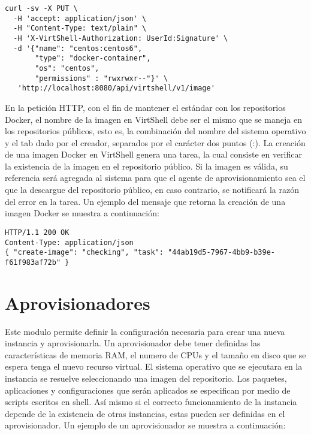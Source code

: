 \vspace{5mm}

\begin{lstlisting}[style=json, caption=Petición HTTP para crear una imagen para contenedores Docker]
curl -sv -X PUT \
  -H 'accept: application/json' \
  -H "Content-Type: text/plain" \
  -H 'X-VirtShell-Authorization: UserId:Signature' \
  -d '{"name": "centos:centos6",
       "type": "docker-container",
       "os": "centos",
       "permissions" : "rwxrwxr--"}' \
   'http://localhost:8080/api/virtshell/v1/image'
\end{lstlisting}

\vspace{5mm}

En la petición HTTP, con el fin de mantener el estándar con los repositorios Docker, el nombre de la imagen en VirtShell debe ser el mismo que se maneja en los repositorios públicos, esto es, la combinación del nombre del sistema operativo y el tab dado por el creador, separados por el carácter dos puntos (:). La creación de una imagen Docker en VirtShell genera una tarea, la cual consiste en verificar la existencia de la imagen en el repositorio público. Si la imagen es válida, su referencia será agregada al sistema para que el agente de aprovisionamiento sea el que la descargue del repositorio público, en caso contrario, se notificará la razón del error en la tarea. Un ejemplo del mensaje que retorna la creación de una imagen Docker se muestra a continuación:

\vspace{5mm}

\begin{lstlisting}[style=json, caption=Ejemplo de respuesta HTTP para la creación de una imagen]
HTTP/1.1 200 OK
Content-Type: application/json
{ "create-image": "checking", "task": "44ab19d5-7967-4bb9-b39e-f61f983af72b" }
\end{lstlisting}


\section{Aprovisionadores}
Este modulo permite definir la configuración necesaria para crear una nueva instancia y aprovisionarla. Un aprovisionador debe tener definidas las características de memoria RAM, el numero de CPUs y el tamaño en disco que se espera tenga el nuevo recurso virtual. El sistema operativo que se ejecutara en la instancia se resuelve seleccionando una imagen del repositorio. Los paquetes, aplicaciones y configuraciones que serán aplicados se especifican por medio de scripts escritos en shell. Así mismo si el correcto funcionamiento de la instancia depende de la existencia de otras instancias, estas pueden ser definidas en el aprovisionador. Un ejemplo de un aprovisionador se muestra a continuación:

